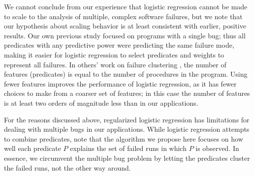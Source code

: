 We cannot conclude from our experience that logistic regression cannot
be made to scale to the analysis of multiple, complex software failures, but we
note that our hypothesis about scaling behavior is at least
consistent with earlier, positive results.  Our own previous study
focused on programs with a single bug; thus all predicates with any
predictive power were predicting the same failure mode, making it
easier for logistic regression to select predicates and weights to
represent all failures.  In others' work on failure clustering
\cite{ICSE`03*465}, the number of features (predicates) is equal to
the number of procedures in the program.  Using fewer features 
improves the performance of logistic regression, as it has fewer choices to
make from a coarser set of features; in this case the number of features is at least two orders of
magnitude less than in our applications.

For the reasons discussed above, regularized logistic regression has
limitations for dealing with multiple bugs in our applications.  While logistic
regression attempts to combine predicates, note that the algorithm we
propose here focuses on how well each predicate $P$ explains the set of failed
runs in which $P$ is observed.
In essence, we circumvent the multiple bug problem by letting the
predicates cluster the failed runs, not the other way around. 

